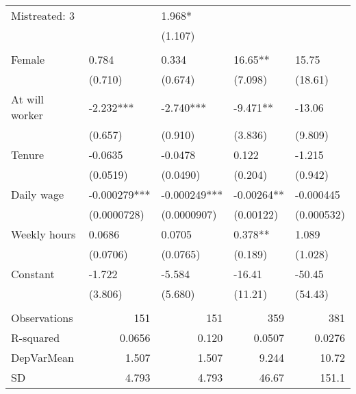 \begin{tabular}{lrrrr}
Mistreated: 3 & \multicolumn{1}{l}{} & \multicolumn{1}{l}{1.968*} & \multicolumn{1}{l}{} & \multicolumn{1}{l}{} \\
      & \multicolumn{1}{l}{} & \multicolumn{1}{l}{(1.107)} & \multicolumn{1}{l}{} & \multicolumn{1}{l}{} \\
      & \multicolumn{1}{l}{} & \multicolumn{1}{l}{} & \multicolumn{1}{l}{} & \multicolumn{1}{l}{} \\
Female & \multicolumn{1}{l}{0.784} & \multicolumn{1}{l}{0.334} & \multicolumn{1}{l}{16.65**} & \multicolumn{1}{l}{15.75} \\
      & \multicolumn{1}{l}{(0.710)} & \multicolumn{1}{l}{(0.674)} & \multicolumn{1}{l}{(7.098)} & \multicolumn{1}{l}{(18.61)} \\
At will worker & \multicolumn{1}{l}{-2.232***} & \multicolumn{1}{l}{-2.740***} & \multicolumn{1}{l}{-9.471**} & \multicolumn{1}{l}{-13.06} \\
      & \multicolumn{1}{l}{(0.657)} & \multicolumn{1}{l}{(0.910)} & \multicolumn{1}{l}{(3.836)} & \multicolumn{1}{l}{(9.809)} \\
Tenure & \multicolumn{1}{l}{-0.0635} & \multicolumn{1}{l}{-0.0478} & \multicolumn{1}{l}{0.122} & \multicolumn{1}{l}{-1.215} \\
      & \multicolumn{1}{l}{(0.0519)} & \multicolumn{1}{l}{(0.0490)} & \multicolumn{1}{l}{(0.204)} & \multicolumn{1}{l}{(0.942)} \\
Daily wage & \multicolumn{1}{l}{-0.000279***} & \multicolumn{1}{l}{-0.000249***} & \multicolumn{1}{l}{-0.00264**} & \multicolumn{1}{l}{-0.000445} \\
      & \multicolumn{1}{l}{(0.0000728)} & \multicolumn{1}{l}{(0.0000907)} & \multicolumn{1}{l}{(0.00122)} & \multicolumn{1}{l}{(0.000532)} \\
Weekly hours & \multicolumn{1}{l}{0.0686} & \multicolumn{1}{l}{0.0705} & \multicolumn{1}{l}{0.378**} & \multicolumn{1}{l}{1.089} \\
      & \multicolumn{1}{l}{(0.0706)} & \multicolumn{1}{l}{(0.0765)} & \multicolumn{1}{l}{(0.189)} & \multicolumn{1}{l}{(1.028)} \\
Constant & \multicolumn{1}{l}{-1.722} & \multicolumn{1}{l}{-5.584} & \multicolumn{1}{l}{-16.41} & \multicolumn{1}{l}{-50.45} \\
      & \multicolumn{1}{l}{(3.806)} & \multicolumn{1}{l}{(5.680)} & \multicolumn{1}{l}{(11.21)} & \multicolumn{1}{l}{(54.43)} \\
      &       &       &       &  \\
Observations & 151   & 151   & 359   & 381 \\
R-squared & 0.0656 & 0.120 & 0.0507 & 0.0276 \\
DepVarMean & 1.507 & 1.507 & 9.244 & 10.72 \\
SD    & 4.793 & 4.793 & 46.67 & 151.1 \\
\bottomrule
\end{tabular}%
